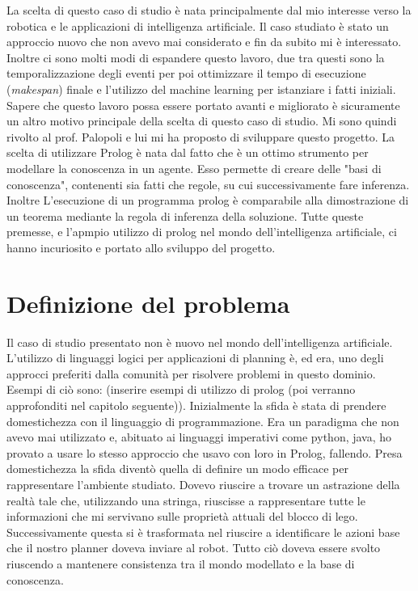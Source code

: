 La scelta di questo caso di studio è nata principalmente dal mio interesse verso la robotica e le applicazioni di intelligenza artificiale.
Il caso studiato è stato un approccio nuovo che non avevo mai considerato e fin da subito mi è interessato.
Inoltre ci sono molti modi di espandere questo lavoro, due tra questi sono la temporalizzazione degli eventi per poi ottimizzare il tempo
di esecuzione (\textit{makespan}) finale e l'utilizzo del machine learning per istanziare i fatti iniziali.
Sapere che questo lavoro possa essere portato avanti e migliorato è sicuramente un altro motivo principale della scelta di questo caso di studio.
Mi sono quindi rivolto al prof. Palopoli e lui mi ha proposto di sviluppare questo progetto.
La scelta di utilizzare Prolog è nata dal fatto che è un ottimo strumento per modellare la conoscenza in un agente.
Esso permette di creare delle "basi di conoscenza", contenenti sia fatti che regole, su cui successivamente fare inferenza.
Inoltre L'esecuzione di un programma prolog è comparabile alla dimostrazione di un teorema mediante la regola di inferenza della soluzione.
Tutte queste premesse, e l'apmpio utilizzo di prolog nel mondo dell'intelligenza artificiale, ci hanno incuriosito e portato allo sviluppo del progetto.

\section{Definizione del problema}
\label{sec:defprob}
Il caso di studio presentato non è nuovo nel mondo dell'intelligenza artificiale. L'utilizzo di linguaggi logici per applicazioni di planning è, ed era, uno
degli approcci preferiti dalla comunità per risolvere problemi in questo dominio. Esempi di ciò sono: (inserire esempi di utilizzo di prolog
(poi verranno approfonditi nel capitolo seguente)). Inizialmente la sfida è stata di prendere domestichezza con il linguaggio di programmazione.
Era un paradigma che non avevo mai utilizzato e, abituato ai linguaggi imperativi come python, java, ho provato a usare lo stesso approccio che usavo con
loro in Prolog, fallendo. Presa domestichezza la sfida diventò quella di definire un modo efficace per rappresentare l'ambiente studiato.
Dovevo riuscire a trovare un astrazione della realtà tale che, utilizzando una stringa, riuscisse a rappresentare tutte le informazioni che mi servivano sulle proprietà
attuali del blocco di lego. Successivamente questa si è trasformata nel riuscire a identificare le azioni base che il nostro planner doveva inviare al robot.
Tutto ciò doveva essere svolto riuscendo a mantenere consistenza tra il mondo modellato e la base di conoscenza.

